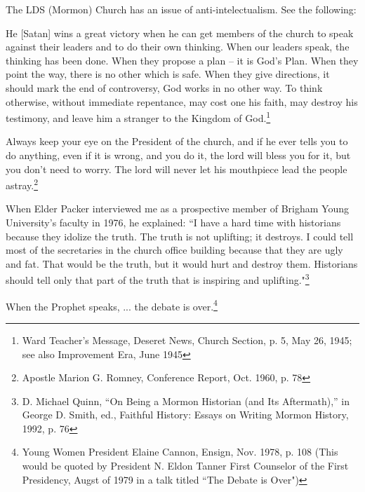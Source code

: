 The LDS (Mormon) Church has an issue of anti-intelectualism. See the following:

\begin{displayquote}
He [Satan] wins a great victory when he can get members of the church to speak
against their leaders and to do their own thinking. When our leaders speak, the
thinking has been done. When they propose a plan – it is God's Plan. When they point
the way, there is no other which is safe. When they give directions, it should mark
the end of controversy, God works in no other way. To think otherwise, without 
immediate repentance, may cost one his faith, may destroy his testimony, and leave 
him a stranger to the Kingdom of God.\footnote{
Ward Teacher's Message, Deseret News, Church Section, p. 5, May 26, 1945; see also 
Improvement Era, June 1945
}
\end{displayquote}

\begin{displayquote}
Always keep your eye on the President of the church, and if he ever tells you to do
anything, even if it is wrong, and you do it, the lord will bless you for it, but you
don't need to worry. The lord will never let his mouthpiece lead the people
astray.\footnote{Apostle Marion G. Romney, Conference Report, Oct. 1960, p. 78}
\end{displayquote}

\begin{displayquote}
When Elder Packer interviewed me as a prospective member of Brigham Young
University's faculty in 1976, he explained: ``I have a hard time with historians
because they idolize the truth. The truth is not uplifting; it destroys. I could tell
most of the secretaries in the church office building because that they are ugly and
fat. That would be the truth, but it would hurt and destroy them. Historians should
tell only that part of the truth that is inspiring and uplifting."\footnote{
D. Michael Quinn, “On Being a Mormon Historian (and Its Aftermath),” in George D. 
Smith, ed., Faithful History: Essays on Writing Mormon History, 1992, p. 76
}
\end{displayquote}

\begin{displayquote}
When the Prophet speaks, ... the debate is over.\footnote{Young Women President Elaine 
Cannon, Ensign, Nov. 1978, p. 108 (This would be quoted by President N. Eldon Tanner
  First Counselor of the First Presidency, Augst of 1979 in a talk titled ``The 
  Debate is Over")}
\end{displayquote}


